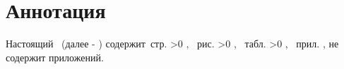 
\chapter*{Аннотация}

\ifNSLHaveESKDFrame
\makeatletter
\def\@oddhead{\zaglavFrame}
\def\@oddfoot{}
\makeatother
\fi

Настоящий \docTypeFull\ (далее - \docType) содержит \pageref{LastPage}\,стр.%
    \ifnum \totfig >0
    , \totfig~рис.%
    \fi
    \ifnum \tottab >0
    , \tottab~табл.%
    \fi
    \ifnum \totapp >0
    , \totapp~прил.%
    \else
    , не содержит приложений.%
    \fi


\ifNSLHaveESKDFrame
\clearpage
\makeatletter
\def\@oddhead{\posledFrame}
\def\@oddfoot{}
\makeatother
\fi



